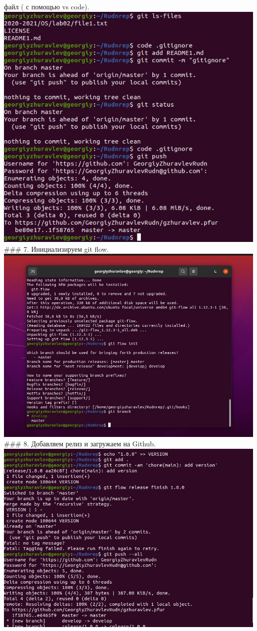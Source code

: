 файл ( с помощью vs code). \includegraphics{scrsht/6.jpg} \#\#\# 7.
Инициализируем git flow. \includegraphics{scrsht/7.jpg} \#\#\# 8.
Добавляем релиз и загружаем на Github. \includegraphics{scrsht/8.jpg}
